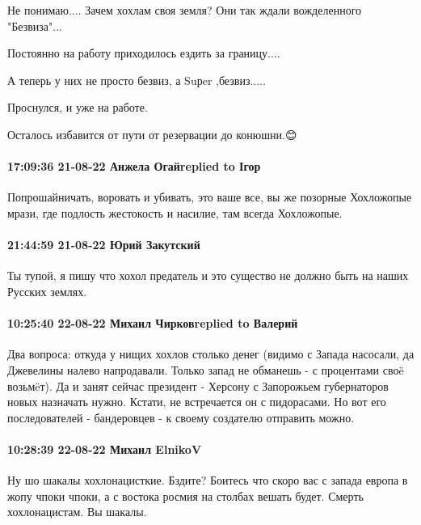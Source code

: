 Не понимаю.... Зачем хохлам своя земля? Они так ждали вожделенного "Безвиза"... 

Постоянно на работу приходилось ездить за границу....

А теперь у них не просто безвиз, а Suрer ,безвиз..... 

Проснулся, и уже на работе. 

Осталось избавится от пути от резервации до конюшни.😊 

\paragraph{17:09:36 21-08-22 Анжела Огайreplied to Ігор}

Попрошайничать, воровать и убивать, это ваше все, вы же позорные Хохложопые
мрази, где подлость жестокость и насилие, там всегда Хохложопые.

\paragraph{21:44:59 21-08-22 Юрий Закутский}

Ты тупой, я пишу что хохол предатель и это существо не должно быть на наших
Русских землях.

\paragraph{10:25:40 22-08-22 Михаил Чирковreplied to Валерий}

Два вопроса: откуда у нищих хохлов столько денег (видимо с Запада насосали, да Джевелины налево напродавали. Только запад не обманешь - с процентами своë возьмëт).
Да и занят сейчас президент - Херсону с Запорожьем губернаторов новых назначать нужно.
Кстати, не встречается он с пидорасами. Но вот его последователей - бандеровцев - к своему создателю отправить можно.

\paragraph{10:28:39 22-08-22 Михаил ElnikoV}

Ну шо шакалы хохлонацисткие. Бздите?
Боитесь что скоро вас с запада европа в жопу чпоки чпоки, а с востока росмия на столбах вешать будет.
Смерть хохлонацистам.
Вы шакалы.

